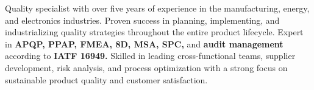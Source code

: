 

\begin{cvparagraph}

Quality specialist with over five years of experience in the manufacturing, energy, and electronics industries. Proven success in planning, implementing, and industrializing quality strategies throughout the entire product lifecycle. Expert in \textbf{APQP, PPAP, FMEA, 8D, MSA, SPC,} and \textbf{audit management} according to \textbf{IATF 16949.} Skilled in leading cross-functional teams, supplier development, risk analysis, and process optimization with a strong focus on sustainable product quality and customer satisfaction.
\end{cvparagraph}